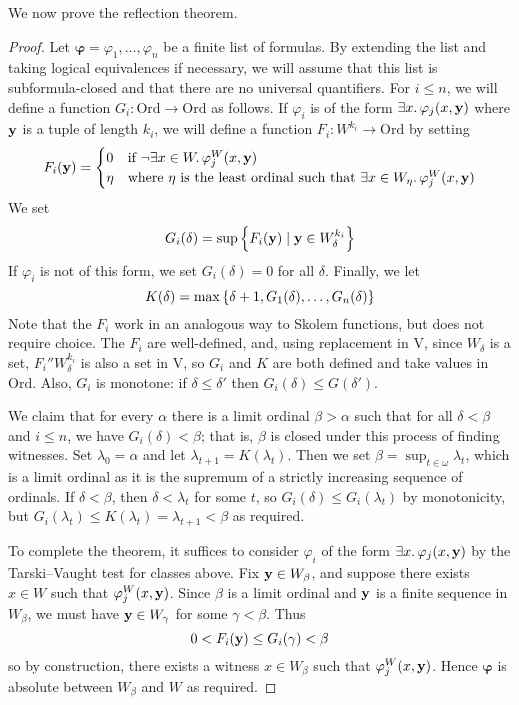 We now prove the reflection theorem.
\begin{proof}
    Let \( \bm\varphi = \varphi_1, \dots, \varphi_n \) be a finite list of formulas.
    By extending the list and taking logical equivalences if necessary, we will assume that this list is subformula-closed and that there are no universal quantifiers.
    For \( i \leq n \), we will define a function \( G_i : \mathrm{Ord} \to \mathrm{Ord} \) as follows.
    If \( \varphi_i \) is of the form \( \exists x.\, \varphi_j(x, \vb y) \) where \( \vb y \) is a tuple of length \( k_i \), we will define a function \( F_i : W^{k_i} \to \mathrm{Ord} \) by setting
    \[ F_i(\vb y) = \begin{cases}
        0 & \text{if } \neg\exists x \in W.\, \varphi_j^W(x, \vb y) \\
        \eta & \text{where } \eta \text{ is the least ordinal such that } \exists x \in W_\eta.\, \varphi_j^W(x, \vb y)
    \end{cases} \]
    We set
    \[ G_i(\delta) = \sup\qty{F_i(\vb y) \mid \vb y \in W_\delta^{k_i}} \]
    If \( \varphi_i \) is not of this form, we set \( G_i(\delta) = 0 \) for all \( \delta \).
    Finally, we let
    \[ K(\delta) = \max\qty{\delta + 1, G_1(\delta), \dots, G_n(\delta)} \]
    Note that the \( F_i \) work in an analogous way to Skolem functions, but does not require choice.
    The \( F_i \) are well-defined, and, using replacement in \( \mathrm{V} \), since \( W_\delta \) is a set, \( F_i '' W_\delta^{k_i} \) is also a set in \( \mathrm{V} \), so \( G_i \) and \( K \) are both defined and take values in \( \mathrm{Ord} \).
    Also, \( G_i \) is monotone: if \( \delta \leq \delta' \) then \( G_i(\delta) \leq G(\delta') \).

    We claim that for every \( \alpha \) there is a limit ordinal \( \beta > \alpha \) such that for all \( \delta < \beta \) and \( i \leq n \), we have \( G_i(\delta) < \beta \); that is, \( \beta \) is closed under this process of finding witnesses.
    Set \( \lambda_0 = \alpha \) and let \( \lambda_{t+1} = K(\lambda_t) \).
    Then we set \( \beta = \sup_{t \in \omega} \lambda_t \), which is a limit ordinal as it is the supremum of a strictly increasing sequence of ordinals.
    If \( \delta < \beta \), then \( \delta < \lambda_t \) for some \( t \), so \( G_i(\delta) \leq G_i(\lambda_t) \) by monotonicity, but \( G_i(\lambda_t) \leq K(\lambda_t) = \lambda_{t+1} < \beta \) as required.

    To complete the theorem, it suffices to consider \( \varphi_i \) of the form \( \exists x.\, \varphi_j(x, \vb y) \) by the Tarski--Vaught test for classes above.
    Fix \( \vb y \in W_\beta \), and suppose there exists \( x \in W \) such that \( \varphi_j^W(x, \vb y) \).
    Since \( \beta \) is a limit ordinal and \( \vb y \) is a finite sequence in \( W_\beta \), we must have \( \vb y \in W_\gamma \) for some \( \gamma < \beta \).
    Thus
    \[ 0 < F_i(\vb y) \leq G_i(\gamma) < \beta \]
    so by construction, there exists a witness \( x \in W_\beta \) such that \( \varphi_j^W(x, \vb y) \).
    Hence \( \bm\varphi \) is absolute between \( W_\beta \) and \( W \) as required.
\end{proof}
